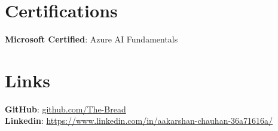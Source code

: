 \documentclass[margin, centered]{res}
\begin{document}
\begin{resume}
		\section{Certifications}
    		\textbf{Microsoft Certified}:
    		    Azure AI Fundamentals\\

		\section{Links}

			\textbf{GitHub}: \href{https://github.com/FireFeathers06}{github.com/The-Bread}
			\\
			\textbf{Linkedin}: \href{https://www.linkedin.com/in/aakarshan-chauhan-36a71616a/}{https://www.linkedin.com/in/aakarshan-chauhan-36a71616a/}
	\end{resume}
\end{document}
